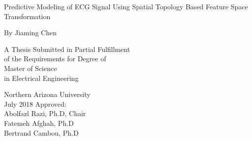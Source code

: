 \begin{center}
	
	{\Large 
	Predictive Modeling of ECG Signal Using Spatial Topology Based Feature Space Transformation
	}
	
	\vfill
	
	By Jiaming Chen
	
	\vfill
A Thesis	
Submitted in Partial Fulfillment\\
of the Requirements for Degree of \\
Master of Science\\
 in Electrical Engineering

	\vfill
	Northern Arizona University\\
	July 2018
	\vfill
	Approved:\\
	Abolfazl Razi, Ph.D, Chair \\
	Fatemeh Afghah, Ph.D\\ 
    Bertrand Cambou, Ph.D	

	
\end{center}
